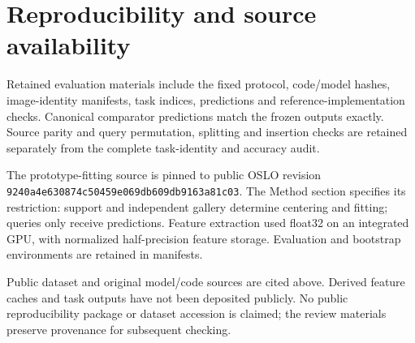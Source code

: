 \section{Reproducibility and source availability}
Retained evaluation materials include the fixed protocol, code/model hashes, image-identity manifests, task indices, predictions and reference-implementation checks. Canonical comparator predictions match the frozen outputs exactly. Source parity and query permutation, splitting and insertion checks are retained separately from the complete task-identity and accuracy audit.

The prototype-fitting source is pinned to public OSLO revision \texttt{9240a4e630874c50459e}\allowbreak\texttt{069db609db9163a81c03}. The Method section specifies its restriction: support and independent gallery determine centering and fitting; queries only receive predictions. Feature extraction used float32 on an integrated GPU, with normalized half-precision feature storage. Evaluation and bootstrap environments are retained in manifests.

Public dataset and original model/code sources are cited above. Derived feature caches and task outputs have not been deposited publicly. No public reproducibility package or dataset accession is claimed; the review materials preserve provenance for subsequent checking.



